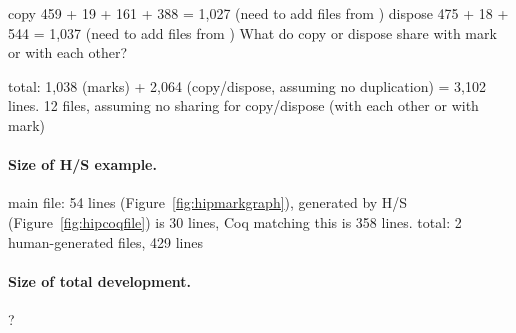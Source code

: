 {copy   459 + 19 + 161 + 388 = 1,027 (need to add files from )
dispose   475 + 18 + 544 = 1,037 (need to add files from )
What do copy or dispose share with mark or with each other?

total: 1,038 (marks) + 2,064 (copy/dispose, assuming no duplication) = 3,102 lines.  12 files, assuming no sharing for copy/dispose (with each other or with mark)

\paragraph{Size of H/S example.}
main file: 54 lines (Figure~\ref{fig:hipmarkgraph}),  generated by H/S (Figure~\ref{fig:hipcoqfile}) is 30 lines, Coq  matching this  is 358 lines.
total: 2 human-generated files, 429 lines

\paragraph{Size of total development.} ?
}
